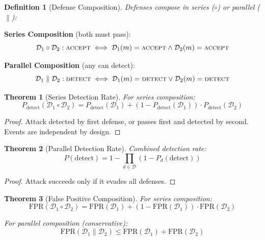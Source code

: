 \documentclass[
]{article}
\newtheorem{definition}{Definition}[section]
\newtheorem{theorem}{Theorem}[section]
\begin{document}
\begin{definition}[Defense Composition]
\label{def:defense-composition}
Defenses compose in series ($\circ$) or parallel ($\parallel$):
\end{definition}

\textbf{Series Composition} (both must pass): \begin{equation}
\label{eq:series-comp}
\mathcal{D}_1 \circ \mathcal{D}_2: \textsc{accept} \iff \mathcal{D}_1(m) = \textsc{accept} \land \mathcal{D}_2(m) = \textsc{accept}
\end{equation}

\textbf{Parallel Composition} (any can detect): \begin{equation}
\label{eq:parallel-comp}
\mathcal{D}_1 \parallel \mathcal{D}_2: \textsc{detect} \iff \mathcal{D}_1(m) = \textsc{detect} \lor \mathcal{D}_2(m) = \textsc{detect}
\end{equation}

\begin{theorem}[Series Detection Rate]
\label{thm:series-detection}
For series composition:
\begin{equation}
\label{eq:series-detection}
P_{\text{detect}}(\mathcal{D}_1 \circ \mathcal{D}_2) = P_{\text{detect}}(\mathcal{D}_1) + (1 - P_{\text{detect}}(\mathcal{D}_1)) \cdot P_{\text{detect}}(\mathcal{D}_2)
\end{equation}
\end{theorem}

\begin{proof}
Attack detected by first defense, or passes first and detected by second. Events are independent by design.
\end{proof}

\begin{theorem}[Parallel Detection Rate]
\label{thm:parallel-detection}
Combined detection rate:
\begin{equation}
\label{eq:parallel-detection}
P(\text{detect}) = 1 - \prod_{d \in \mathcal{D}} (1 - P_d(\text{detect}))
\end{equation}
\end{theorem}

\begin{proof}
Attack succeeds only if it evades all defenses.
\end{proof}

\begin{theorem}[False Positive Composition]
\label{thm:fpr-composition}
For series composition:
\begin{equation}
\label{eq:fpr-series}
\text{FPR}(\mathcal{D}_1 \circ \mathcal{D}_2) = \text{FPR}(\mathcal{D}_1) + (1 - \text{FPR}(\mathcal{D}_1)) \cdot \text{FPR}(\mathcal{D}_2)
\end{equation}

For parallel composition (conservative):
\begin{equation}
\label{eq:fpr-parallel}
\text{FPR}(\mathcal{D}_1 \parallel \mathcal{D}_2) \leq \text{FPR}(\mathcal{D}_1) + \text{FPR}(\mathcal{D}_2)
\end{equation}
\end{theorem}
\end{document}
